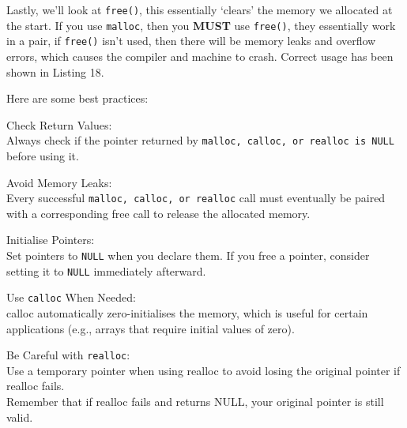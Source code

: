 \documentclass[a4paper,12pt]{article}
\begin{document}
Lastly, we'll look at \verb|free()|, this essentially `clears' the memory we allocated at the start. If you use \verb|malloc|, then you \textbf{MUST} use \verb|free()|, they essentially work in a pair, if \verb|free()| isn't used, then there will be memory leaks and overflow errors, which causes the compiler and machine to crash. Correct usage has been shown in Listing 18. 

\begin{center}
\end{center}

Here are some best practices:

Check Return Values:\\
Always check if the pointer returned by \verb|malloc, calloc, or realloc is NULL| before using it.

Avoid Memory Leaks:\\
Every successful \verb|malloc, calloc, or realloc| call must eventually be paired with a corresponding free call to release the allocated memory.

Initialise Pointers:\\
Set pointers to \verb|NULL| when you declare them. If you free a pointer, consider setting it to \verb|NULL| immediately afterward.

Use \verb|calloc| When Needed:\\
calloc automatically zero-initialises the memory, which is useful for certain applications (e.g., arrays that require initial values of zero).

Be Careful with \verb|realloc|:\\
Use a temporary pointer when using realloc to avoid losing the original pointer if realloc fails.\\
Remember that if realloc fails and returns NULL, your original pointer is still valid.
\end{document}
